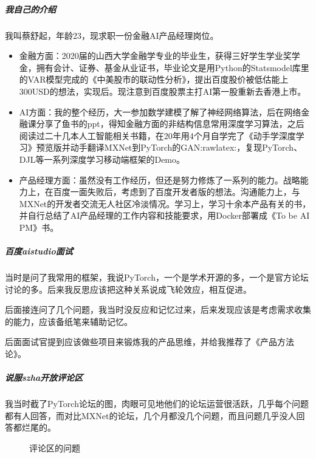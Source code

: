 \documentclass[letterpaper,11pt,english]{sphinxmanual}
\begin{document}
\subparagraph{我自己的介绍}
\label{\detokenize{chapter_interview/simulate_interview:id5}}
我叫蔡舒起，年龄23，现求职一份金融AI产品经理岗位。
\begin{itemize}
\item {} 
金融方面：2020届的山西大学金融学专业的毕业生，获得三好学生学业奖学金，拥有会计、证券、基金从业证书，毕业论文是用Python的Statsmodel库里的VAR模型完成的《中美股市的联动性分析》，提出百度股价被低估能上300USD的想法，实现后。现注意到百度股票主打AI第一股重新去香港上市。

\item {} 
AI方面：我的整个经历，大一参加数学建模了解了神经网络算法，后在网络金融课分享了鱼书的ppt，得知金融方面的非结构信息常用深度学习算法，之后阅读过二十几本人工智能相关书籍，在20年用4个月自学完了《动手学深度学习》预览版并动手翻译MXNet到PyTorch的GAN:raw\sphinxhyphen{}latex:，复现PyTorch、DJL等一系列深度学习移动端框架的Demo。

\item {} 
产品经理方面：虽然没有工作经历，但还是努力修炼了一系列的能力。战略能力上，在百度一面失败后，考虑到了百度开发者版的想法。沟通能力上，与MXNet的开发者交流无人社区冷淡情况。学习上，学习十余本产品有关的书，并自行总结了AI产品经理的工作内容和技能要求，用Docker部署成《To
be AI PM》书。

\end{itemize}


\subparagraph{百度aistudio面试}
\label{\detokenize{chapter_interview/simulate_interview:aistudio}}
当时是问了我常用的框架，我说PyTorch，一个是学术开源的多，一个是官方论坛讨论的多。后来我反思应该把这种关系说成飞轮效应，相互促进。

后面接连问了几个问题，我当时没反应和记忆过来，后来发现应该是考虑需求收集的能力，应该备纸笔来辅助记忆。

后面面试官提到应该做些项目来锻炼我的产品思维，并给我推荐了《产品方法论》。



\subparagraph{说服szha开放评论区}
\label{\detokenize{chapter_interview/simulate_interview:szha}}

我当时截了PyTorch论坛的图，肉眼可见地他们的论坛运营很活跃，几乎每个问题都有人回答，而对比MXNet的论坛，几个月都没几个问题，而且问题几乎没人回答都烂尾的。

\begin{figure}[H]
\centering
\capstart

\noindent{}
\caption{评论区的问题}\label{\detokenize{chapter_interview/simulate_interview:id14}}\end{figure}
\end{document}
